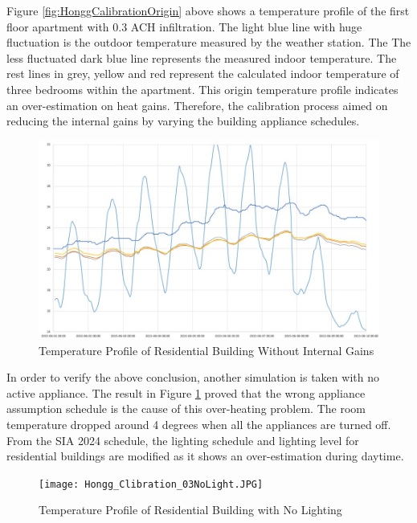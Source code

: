 			Figure \ref{fig:HonggCalibrationOrigin} above shows a temperature profile of the first floor apartment with 0.3 ACH infiltration. The light blue line with huge fluctuation is the outdoor temperature measured by the weather station. The The less fluctuated dark blue line represents the measured indoor temperature. The rest lines in grey, yellow and red represent the calculated indoor temperature of three bedrooms within the apartment. This origin temperature profile indicates an over-estimation on heat gains. Therefore, the calibration process aimed on reducing the internal gains by varying the building appliance schedules.\\
			
			\begin{figure}[H]
			\centering
			\includegraphics[scale=0.6]{Figure/Hongg_Cali_NoFacility.JPG}
			\caption{Temperature Profile of Residential Building Without Internal Gains}
			\label{fig:HonggCalibrationNoGains}
			\end{figure}
			
			In order to verify the above conclusion, another simulation is taken with no active appliance. The result in Figure \ref{fig:HonggCalibrationNoGains} proved that the wrong appliance assumption schedule is the cause of this over-heating problem. The room temperature dropped around 4 degrees when all the appliances are turned off. From the SIA 2024 schedule, the lighting schedule and lighting level for residential buildings are modified as it shows an over-estimation during daytime. \\

			\begin{figure}[H]
			\centering
			\texttt{[image: Hongg\_Clibration\_03NoLight.JPG]}
			\caption{Temperature Profile of Residential Building with No Lighting}
			\label{fig:HonggerCalibrationNoLight}
			\end{figure}

